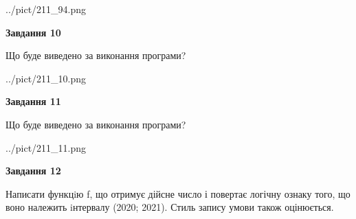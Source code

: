 \documentclass[12pt, ukrainian]{article}
\begin{document}
{\begin {large}
\begin{center}
	{../pict/211_94.png}
\end{center}
\newpage

{\begin {center}\textbf{Завдання 10}\end {center}}

Що буде виведено за виконання програми?\par
\begin{center}
	{../pict/211_10.png}
\end{center}
\newpage

{\begin {center}\textbf{Завдання 11}\end {center}}

Що буде виведено за виконання програми?\par
\begin{center}
	{../pict/211_11.png}
\end{center}
\newpage

{\begin {center}\textbf{Завдання 12}\end {center}}


Написати функцiю f, що отримує дійсне число і повертає логічну ознаку того, що воно належить iнтервалу (2020; 2021). Стиль запису умови також оцінюється.\par
\newpage

\end {large}}
\end{document}
